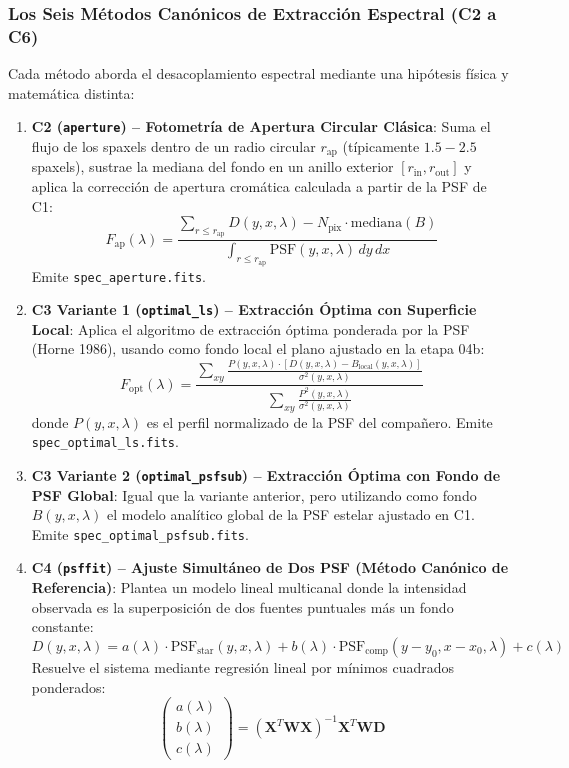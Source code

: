 \documentclass[11pt,a4paper]{article}
\begin{document}
\subsubsection{Los Seis Métodos Canónicos de Extracción Espectral (C2 a C6)}
Cada método aborda el desacoplamiento espectral mediante una hipótesis física y matemática distinta:
\begin{enumerate}[leftmargin=1.0cm]
    \item \textbf{C2 (\texttt{aperture}) -- Fotometría de Apertura Circular Clásica}:
    Suma el flujo de los spaxels dentro de un radio circular $r_\text{ap}$ (típicamente $1.5 - 2.5$ spaxels), sustrae la mediana del fondo en un anillo exterior $[r_\text{in}, r_\text{out}]$ y aplica la corrección de apertura cromática calculada a partir de la PSF de C1:
    $$F_\text{ap}(\lambda) = \frac{\sum_{r \le r_\text{ap}} D(y, x, \lambda) - N_\text{pix} \cdot \text{mediana}(B)}{\int_{r \le r_\text{ap}} \text{PSF}(y, x, \lambda) \, dy \, dx}$$
    Emite \texttt{spec\_aperture.fits}.
    \item \textbf{C3 Variante 1 (\texttt{optimal\_ls}) -- Extracción Óptima con Superficie Local}:
    Aplica el algoritmo de extracción óptima ponderada por la PSF (Horne 1986), usando como fondo local el plano ajustado en la etapa 04b:
    $$F_\text{opt}(\lambda) = \frac{\sum_{xy} \frac{P(y, x, \lambda) \cdot [D(y, x, \lambda) - B_\text{local}(y, x, \lambda)]}{\sigma^2(y, x, \lambda)}}{\sum_{xy} \frac{P^2(y, x, \lambda)}{\sigma^2(y, x, \lambda)}}$$
    donde $P(y, x, \lambda)$ es el perfil normalizado de la PSF del compañero. Emite \texttt{spec\_optimal\_ls.fits}.
    \item \textbf{C3 Variante 2 (\texttt{optimal\_psfsub}) -- Extracción Óptima con Fondo de PSF Global}:
    Igual que la variante anterior, pero utilizando como fondo $B(y, x, \lambda)$ el modelo analítico global de la PSF estelar ajustado en C1. Emite \texttt{spec\_optimal\_psfsub.fits}.
    \item \textbf{C4 (\texttt{psffit}) -- Ajuste Simultáneo de Dos PSF (Método Canónico de Referencia)}:
    Plantea un modelo lineal multicanal donde la intensidad observada es la superposición de dos fuentes puntuales más un fondo constante:
    $$D(y, x, \lambda) = a(\lambda) \cdot \text{PSF}_\text{star}(y, x, \lambda) + b(\lambda) \cdot \text{PSF}_\text{comp}(y - y_0, x - x_0, \lambda) + c(\lambda)$$
    Resuelve el sistema mediante regresión lineal por mínimos cuadrados ponderados:
    $$\begin{pmatrix} a(\lambda) \\ b(\lambda) \\ c(\lambda) \end{pmatrix} = \left(\mathbf{X}^T \mathbf{W} \mathbf{X}\right)^{-1} \mathbf{X}^T \mathbf{W} \mathbf{D}$$

\end{enumerate}
\end{document}

